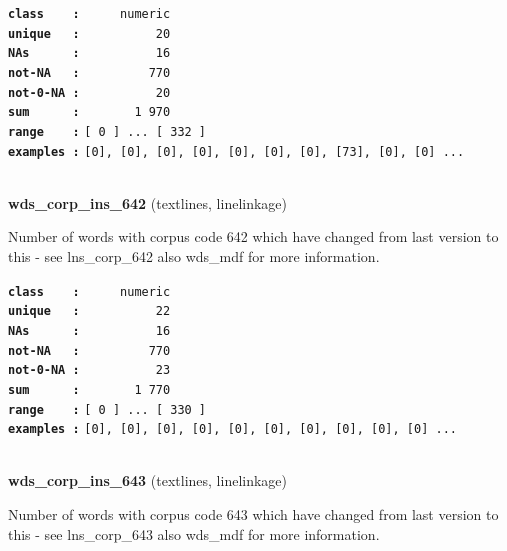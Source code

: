 \documentclass[]{article}
\begin{document}
\textbf{\texttt{class\ \ \ \ :}} \texttt{~~~~~numeric}\\
\textbf{\texttt{unique\ \ \ :}} \texttt{~~~~~~~~~~20}\\
\textbf{\texttt{NAs\ \ \ \ \ \ :}} \texttt{~~~~~~~~~~16}\\
\textbf{\texttt{not-NA\ \ \ :}} \texttt{~~~~~~~~~770}\\
\textbf{\texttt{not-0-NA\ :}} \texttt{~~~~~~~~~~20}\\
\textbf{\texttt{sum\ \ \ \ \ \ :}} \texttt{~~~~~~~1~970}\\
\textbf{\texttt{range\ \ \ \ :}}
\texttt{{[}\ 0\ {]}\ ...\ {[}\ 332\ {]}}\\
\textbf{\texttt{examples\ :}}
\texttt{{[}0{]},\ {[}0{]},\ {[}0{]},\ {[}0{]},\ {[}0{]},\ {[}0{]},\ {[}0{]},\ {[}73{]},\ {[}0{]},\ {[}0{]}\ ...}\\

~

\textbf{wds\_corp\_ins\_642} (textlines, linelinkage)

Number of words with corpus code 642 which have changed from last
version to this - see lns\_corp\_642 also wds\_mdf for more information.

\textbf{\texttt{class\ \ \ \ :}} \texttt{~~~~~numeric}\\
\textbf{\texttt{unique\ \ \ :}} \texttt{~~~~~~~~~~22}\\
\textbf{\texttt{NAs\ \ \ \ \ \ :}} \texttt{~~~~~~~~~~16}\\
\textbf{\texttt{not-NA\ \ \ :}} \texttt{~~~~~~~~~770}\\
\textbf{\texttt{not-0-NA\ :}} \texttt{~~~~~~~~~~23}\\
\textbf{\texttt{sum\ \ \ \ \ \ :}} \texttt{~~~~~~~1~770}\\
\textbf{\texttt{range\ \ \ \ :}}
\texttt{{[}\ 0\ {]}\ ...\ {[}\ 330\ {]}}\\
\textbf{\texttt{examples\ :}}
\texttt{{[}0{]},\ {[}0{]},\ {[}0{]},\ {[}0{]},\ {[}0{]},\ {[}0{]},\ {[}0{]},\ {[}0{]},\ {[}0{]},\ {[}0{]}\ ...}\\

~

\textbf{wds\_corp\_ins\_643} (textlines, linelinkage)

Number of words with corpus code 643 which have changed from last
version to this - see lns\_corp\_643 also wds\_mdf for more information.
\end{document}
